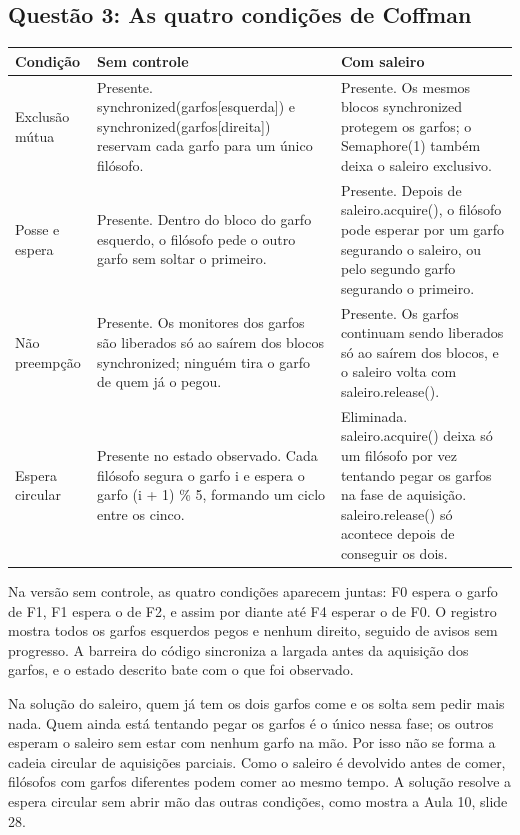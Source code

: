 \documentclass[11pt,a4paper]{article}
\newcommand{\code}[1]{{\small\ttfamily #1}}
\begin{document}
\subsection*{Questão 3: As quatro condições de Coffman}
{\small\begin{tabularx}{\textwidth}{|L{2.1cm}|Y|Y|}\hline
{}\textbf{Condição} & \textbf{Sem controle} & \textbf{Com saleiro}\\\hline
Exclusão mútua & Presente. \code{synchronized(\allowbreak{}garfos[\allowbreak{}esquerda])} e \code{synchronized(\allowbreak{}garfos[\allowbreak{}direita])} reservam cada garfo para um único filósofo. & Presente. Os mesmos blocos \code{synchronized} protegem os garfos; o \code{Semaphore(\allowbreak{}1)} também deixa o saleiro exclusivo.\\\hline
Posse e espera & Presente. Dentro do bloco do garfo esquerdo, o filósofo pede o outro garfo sem soltar o primeiro. & Presente. Depois de \code{saleiro.\allowbreak{}acquire(\allowbreak{})}, o filósofo pode esperar por um garfo segurando o saleiro, ou pelo segundo garfo segurando o primeiro.\\\hline
Não preempção & Presente. Os monitores dos garfos são liberados só ao saírem dos blocos \code{synchronized}; ninguém tira o garfo de quem já o pegou. & Presente. Os garfos continuam sendo liberados só ao saírem dos blocos, e o saleiro volta com \code{saleiro.\allowbreak{}release(\allowbreak{})}.\\\hline
Espera circular & Presente no estado observado. Cada filósofo segura o garfo \code{i} e espera o garfo \code{(\allowbreak{}i + 1) \% 5}, formando um ciclo entre os cinco. & Eliminada. \code{saleiro.\allowbreak{}acquire(\allowbreak{})} deixa só um filósofo por vez tentando pegar os garfos na fase de aquisição. \code{saleiro.\allowbreak{}release(\allowbreak{})} só acontece depois de conseguir os dois.\\\hline
\end{tabularx}}\par\vspace{3pt}
Na versão sem controle, as quatro condições aparecem juntas: F0 espera o garfo de F1, F1 espera o de F2, e assim por diante até F4 esperar o de F0. O registro mostra todos os garfos esquerdos pegos e nenhum direito, seguido de avisos sem progresso. A barreira do código sincroniza a largada antes da aquisição dos garfos, e o estado descrito bate com o que foi observado.

Na solução do saleiro, quem já tem os dois garfos come e os solta sem pedir mais nada. Quem ainda está tentando pegar os garfos é o único nessa fase; os outros esperam o saleiro sem estar com nenhum garfo na mão. Por isso não se forma a cadeia circular de aquisições parciais. Como o saleiro é devolvido antes de comer, filósofos com garfos diferentes podem comer ao mesmo tempo. A solução resolve a espera circular sem abrir mão das outras condições, como mostra a Aula 10, slide 28.
\end{document}
